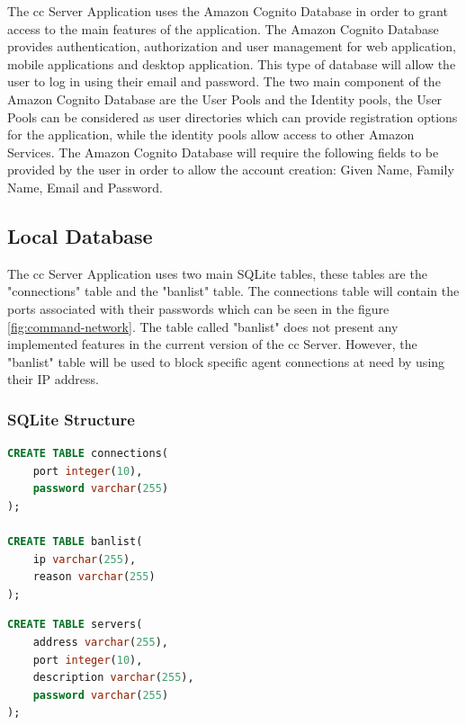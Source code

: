 The \acrfull{cc} Server Application uses the Amazon Cognito Database in order to grant
access to the main features of the application. The Amazon Cognito Database provides
authentication, authorization and user management for web application, mobile applications
and desktop application. This type of database will allow the user to log in using
their email and password. The two main component of the Amazon Cognito Database are
the User Pools and the Identity pools, the User Pools can be considered as user
directories which can provide registration options for the application, while the
identity pools allow access to other Amazon Services. The Amazon Cognito Database
will require the following fields to be provided by the user in order to allow
the account creation: Given Name, Family Name, Email and Password.

\subsection{Local Database}

The \acrfull{cc} Server Application uses two main SQLite tables, these tables are
the "connections" table and the "banlist" table. The connections table will contain
the ports associated with their passwords which can be seen in the figure
\ref{fig:command-network}. The table called "banlist" does not present any implemented
features in the current version of the \acrfull{cc} Server. However, the "banlist" table
will be used to block specific agent connections at need by using their IP address.

\subsubsection{SQLite Structure}

\begin{lstlisting}[language=SQL, style=Oracle, columns=fullflexible,
       caption=Command \& Control (C\&C) SQLite Tables,
       captionpos=b]
CREATE TABLE connections(
    port integer(10),
    password varchar(255)
);

CREATE TABLE banlist(
    ip varchar(255),
    reason varchar(255)
);
\end{lstlisting}

\begin{lstlisting}[language=SQL, style=Oracle, columns=fullflexible,
caption=Agent (Client-Side) SQLite Tables,
captionpos=b]
CREATE TABLE servers(
    address varchar(255),
    port integer(10),
    description varchar(255),
    password varchar(255)
);
\end{lstlisting}

